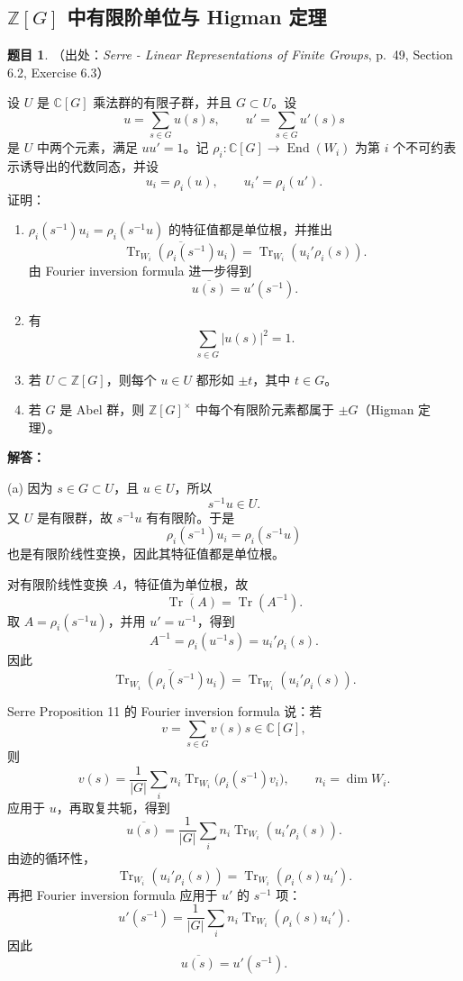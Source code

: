 \documentclass[a4paper]{ctexart}
\theoremstyle{definition}
\newtheorem{example}{题目}[section]
\theoremstyle{analysis}
\theoremstyle{plain}
\begin{document}
\subsection{\texorpdfstring{\(\mathbb Z[G]\) 中有限阶单位与 Higman 定理}{Z[G] 中有限阶单位与 Higman 定理}}\label{subsec:problem-serre-higman-units}

\begin{example}
（出处：\textit{Serre - Linear Representations of Finite Groups}, p.~49, Section 6.2, Exercise 6.3）

设 \(U\) 是 \(\mathbb C[G]\) 乘法群的有限子群，并且 \(G\subset U\)。设
\[
  u=\sum_{s\in G}u(s)s,\qquad
  u'=\sum_{s\in G}u'(s)s
\]
是 \(U\) 中两个元素，满足 \(uu'=1\)。记 \(\rho_i:\mathbb C[G]\to \operatorname{End}(W_i)\)
为第 \(i\) 个不可约表示诱导出的代数同态，并设
\[
  u_i=\rho_i(u),\qquad u_i'=\rho_i(u').
\]
证明：
\begin{enumerate}
  \item \(\rho_i(s^{-1})u_i=\rho_i(s^{-1}u)\) 的特征值都是单位根，并推出
  \[
    \overline{\operatorname{Tr}_{W_i}(\rho_i(s^{-1})u_i)}
    =
    \operatorname{Tr}_{W_i}(u_i'\rho_i(s)).
  \]
  由 Fourier inversion formula 进一步得到
  \[
    \overline{u(s)}=u'(s^{-1}).
  \]
  \item 有
  \[
    \sum_{s\in G}|u(s)|^2=1.
  \]
  \item 若 \(U\subset \mathbb Z[G]\)，则每个 \(u\in U\) 都形如 \(\pm t\)，其中 \(t\in G\)。
  \item 若 \(G\) 是 Abel 群，则 \(\mathbb Z[G]^\times\) 中每个有限阶元素都属于 \(\pm G\)（Higman 定理）。
\end{enumerate}

\textbf{解答：}

(a) 因为 \(s\in G\subset U\)，且 \(u\in U\)，所以
\[
  s^{-1}u\in U.
\]
又 \(U\) 是有限群，故 \(s^{-1}u\) 有有限阶。于是
\[
  \rho_i(s^{-1})u_i=\rho_i(s^{-1}u)
\]
也是有限阶线性变换，因此其特征值都是单位根。

对有限阶线性变换 \(A\)，特征值为单位根，故
\[
  \overline{\operatorname{Tr}(A)}=\operatorname{Tr}(A^{-1}).
\]
取 \(A=\rho_i(s^{-1}u)\)，并用 \(u'=u^{-1}\)，得到
\[
  A^{-1}=\rho_i(u^{-1}s)=u_i'\rho_i(s).
\]
因此
\[
  \overline{\operatorname{Tr}_{W_i}(\rho_i(s^{-1})u_i)}
  =
  \operatorname{Tr}_{W_i}(u_i'\rho_i(s)).
\]

Serre Proposition 11 的 Fourier inversion formula 说：若
\[
  v=\sum_{s\in G}v(s)s\in\mathbb C[G],
\]
则
\[
  v(s)=\frac{1}{|G|}
  \sum_i n_i\operatorname{Tr}_{W_i}\bigl(\rho_i(s^{-1})v_i\bigr),
  \qquad n_i=\dim W_i.
\]
应用于 \(u\)，再取复共轭，得到
\[
  \overline{u(s)}
  =
  \frac{1}{|G|}
  \sum_i n_i\operatorname{Tr}_{W_i}(u_i'\rho_i(s)).
\]
由迹的循环性，
\[
  \operatorname{Tr}_{W_i}(u_i'\rho_i(s))
  =
  \operatorname{Tr}_{W_i}(\rho_i(s)u_i').
\]
再把 Fourier inversion formula 应用于 \(u'\) 的 \(s^{-1}\) 项：
\[
  u'(s^{-1})
  =
  \frac{1}{|G|}
  \sum_i n_i\operatorname{Tr}_{W_i}(\rho_i(s)u_i').
\]
因此
\[
  \overline{u(s)}=u'(s^{-1}).
\]


\end{example}
\end{document}
